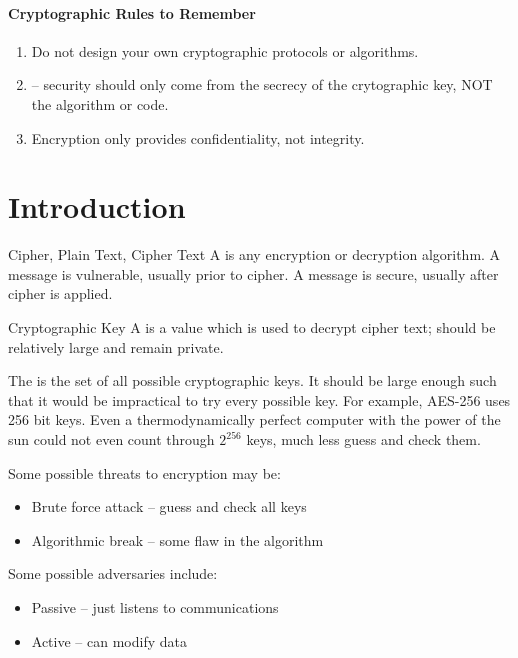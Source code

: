 \documentclass[12pt]{report}
\begin{document}
\paragraph{Cryptographic Rules to Remember}
\begin{enumerate}
    \item Do not design your own cryptographic protocols or algorithms.
    \item {} -- security should only come from the secrecy of the crytographic key, NOT the algorithm or code.
    \item Encryption only provides confidentiality, not integrity.
\end{enumerate}

\section{Introduction}

\begin{dfnbox}{Cipher, Plain Text, Cipher Text}{}
    A  is any encryption or decryption algorithm. A  message is vulnerable, usually prior to cipher. A  message is secure, usually after cipher is applied.
\end{dfnbox}

\begin{dfnbox}{Cryptographic Key}{}
    A  is a value which is used to decrypt cipher text; should be relatively large and remain private.
\end{dfnbox}

The  is the set of all possible cryptographic keys. It should be large enough such that it would be impractical to try every possible key. For example, AES-256 uses 256 bit keys. Even a thermodynamically perfect computer with the power of the sun could not even count through $2^{256}$ keys, much less guess and check them.

Some possible threats to encryption may be:
\begin{itemize}
    \item Brute force attack -- guess and check all keys
    \item Algorithmic break -- some flaw in the algorithm
\end{itemize}

Some possible adversaries include:
\begin{itemize}
    \item Passive -- just listens to communications
    \item Active -- can modify data
\end{itemize}
\end{document}
